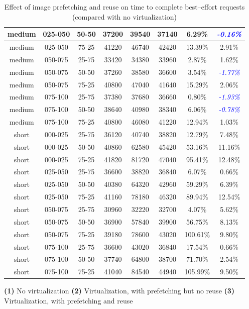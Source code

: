 \begin{table}
\begin{center}
\begin{tabular}{|c|c|c|c|c|c|c|c|}
medium & 025-050 & 50-50 & 37200 & 39540 & 37140 & 6.29\% & \textcolor{blue}{\textit{-0.16\%}}
\\\hline
medium & 025-050 & 75-25 & 41220 & 46740 & 42420 & 13.39\% & 2.91\%
\\\hline
medium & 050-075 & 25-75 & 33420 & 34380 & 33960 & 2.87\% & 1.62\%
\\\hline
medium & 050-075 & 50-50 & 37260 & 38580 & 36600 & 3.54\% & \textcolor{blue}{\textit{-1.77\%}}
\\\hline
medium & 050-075 & 75-25 & 40800 & 47040 & 41640 & 15.29\% & 2.06\%
\\\hline
medium & 075-100 & 25-75 & 37380 & 37680 & 36660 & 0.80\% & \textcolor{blue}{\textit{-1.93\%}}
\\\hline
medium & 075-100 & 50-50 & 38640 & 40980 & 38340 & 6.06\% & \textcolor{blue}{\textit{-0.78\%}}
\\\hline
medium & 075-100 & 75-25 & 40800 & 46080 & 41220 & 12.94\% & 1.03\%
\\\hline
short & 000-025 & 25-75 & 36120 & 40740 & 38820 & 12.79\% & 7.48\%
\\\hline
short & 000-025 & 50-50 & 40860 & 62580 & 45420 & 53.16\% & 11.16\%
\\\hline
short & 000-025 & 75-25 & 41820 & 81720 & 47040 & 95.41\% & 12.48\% 
\\\hline
short & 025-050 & 25-75 & 36600 & 38820 & 36840 & 6.07\% & 0.66\%
\\\hline
short & 025-050 & 50-50 & 40380 & 64320 & 42960 & 59.29\% & 6.39\%
\\\hline
short & 025-050 & 75-25 & 41160 & 78180 & 46320 & 89.94\% & 12.54\%
\\\hline
short & 050-075 & 25-75 & 30960 & 32220 & 32700 & 4.07\% & 5.62\%
\\\hline
short & 050-075 & 50-50 & 36900 & 57840 & 39900 & 56.75\% & 8.13\% 
\\\hline
short & 050-075 & 75-25 & 39180 & 78600 & 43020 & 100.61\% & 9.80\% 
\\\hline
short & 075-100 & 25-75 & 36600 & 43020 & 36840 & 17.54\% & 0.66\%
\\\hline
short & 075-100 & 50-50 & 37740 & 64800 & 38700 & 71.70\% & 2.54\% 
\\\hline
short & 075-100 & 75-25 & 41040 & 84540 & 44940 & 105.99\% & 9.50\% 
\\\hline
\end{tabular}

\textbf{(1)} No virtualization
\textbf{(2)} Virtualization, with prefetching but no reuse
\textbf{(3)} Virtualization, with prefetching and reuse
\caption{Effect of image prefetching and reuse on time to complete best--effort requests (compared with no virtualization)}
\label{tab:novmVSfetch}
\end{center}
\end{table}



